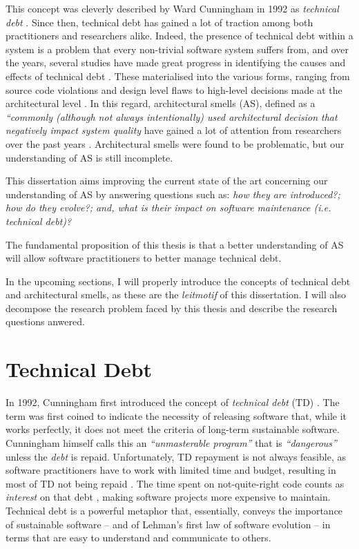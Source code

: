 This concept was cleverly described by Ward Cunningham in 1992 as \emph{technical debt} \cite{Cunningham1992}.
Since then, technical debt has gained a lot of traction among both practitioners and researchers alike.
Indeed, the presence of technical debt within a system is a problem that every non-trivial software system suffers from, and over the years, several studies have made great progress in identifying the causes and effects of technical debt \cite{Brown2010,Kruchten2012,Lehman1979}.
These materialised into the various forms, ranging from source code violations \cite{Letouzey2012,Curtis2012} and design level flaws \cite{Marinescu2012} to high-level decisions made at the architectural level \cite{Ernst2015,Yli-Huumo2014}.
In this regard, architectural smells (AS), defined as a \emph{``commonly (although not always intentionally) used architectural decision that negatively impact system quality} \cite{Garcia2009} have gained a lot of attention from researchers over the past years \cite{Verdecchia2018}.
Architectural smells were found to be problematic, but our understanding of AS is still incomplete.

This dissertation aims improving the current state of the art concerning our understanding of AS by answering questions such as: \emph{how they are introduced?; how do they evolve?; and, what is their impact on software maintenance (i.e. technical debt)?}

The fundamental proposition of this thesis is that a better understanding of AS will allow software practitioners to better manage technical debt.

In the upcoming sections, I will properly introduce the concepts of technical debt and architectural smells, as these are the \emph{leitmotif} of this dissertation. I will also decompose the research problem faced by this thesis and describe the research questions anwered.

\section{Technical Debt}
In 1992, Cunningham first introduced the concept of \emph{technical debt} (TD) \cite{Cunningham1992}. 
The term was first coined to indicate the necessity of releasing software that, while it works perfectly, it does not meet the criteria of long-term sustainable software. 
Cunningham himself calls this an \emph{``unmasterable program''} that is \emph{``dangerous''} unless the \emph{debt} is repaid.
Unfortunately, TD repayment is not always feasible, as software practitioners have to work with limited time and budget, resulting in most of TD not being repaid \cite{Digkas2018}.
The time spent on not-quite-right code counts as \emph{interest} on that debt \cite{Cunningham1992}, making software projects more expensive to maintain.
Technical debt is a powerful metaphor that, essentially, conveys the importance of sustainable software -- and of Lehman's first law of software evolution -- in terms that are easy to understand and communicate to others. 

